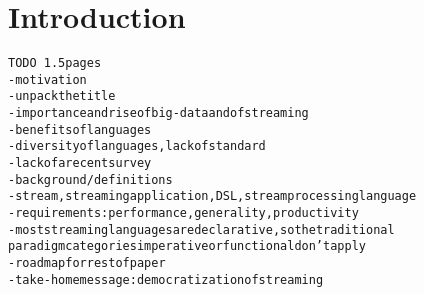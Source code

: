 \section{Introduction}\label{sec:introduction}

\begin{alltt}TODO\scriptsize ~1.5 pages
- motivation
  - unpack the title
  - importance and rise of big-data and of streaming
  - benefits of languages
  - diversity of languages, lack of standard
  - lack of a recent survey \cite{stephens_1997} \cite{johnston_hanna_millar_2004}
- background / definitions
  - stream, streaming application, DSL, stream processing language
  - requirements: performance, generality, productivity
  - most streaming languages are declarative, so the traditional
    paradigm categories imperative or functional don't apply
- roadmap for rest of paper
- take-home message: democratization of streaming
\end{alltt}
